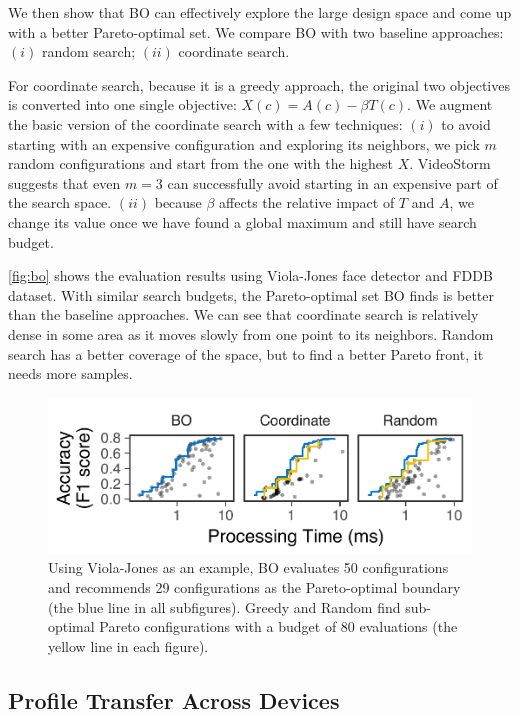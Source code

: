 

We then show that BO can effectively explore the large design space and come up
with a better Pareto-optimal set. We compare BO with two baseline approaches:
$(i)$ random search; $(ii)$ coordinate search.

For coordinate search, because it is a greedy approach, the original two
objectives is converted into one single objective: $X(c) = A(c) - \beta
T(c)$. We augment the basic version of the coordinate search with a few
techniques: $(i)$ to avoid starting with an expensive configuration and
exploring its neighbors, we pick $m$ random configurations and start from the
one with the highest $X$. VideoStorm~\cite{zhang2017live} suggests that even
$m = 3$ can successfully avoid starting in an expensive part of the search
space. $(ii)$ because $\beta$ affects the relative impact of $T$ and $A$, we
change its value once we have found a global maximum and still have search
budget.

\autoref{fig:bo} shows the evaluation results using Viola-Jones face detector
and FDDB dataset. With similar search budgets, the Pareto-optimal set BO finds
is better than the baseline approaches. We can see that coordinate search is
relatively dense in some area as it moves slowly from one point to its
neighbors. Random search has a better coverage of the space, but to find a
better Pareto front, it needs more samples.

\begin{figure}
  \centering
  \includegraphics[width=0.85\columnwidth]{figures/bo-eval.pdf}
  \caption{Using Viola-Jones as an example, BO evaluates 50 configurations and
    recommends 29 configurations as the Pareto-optimal boundary (the blue line
    in all subfigures). Greedy and Random find sub-optimal Pareto configurations
    with a budget of 80 evaluations (the yellow line in each figure).}
  \label{fig:bo}
\end{figure}

\subsection{Profile Transfer Across Devices}
\label{sec:performance-transfer}

